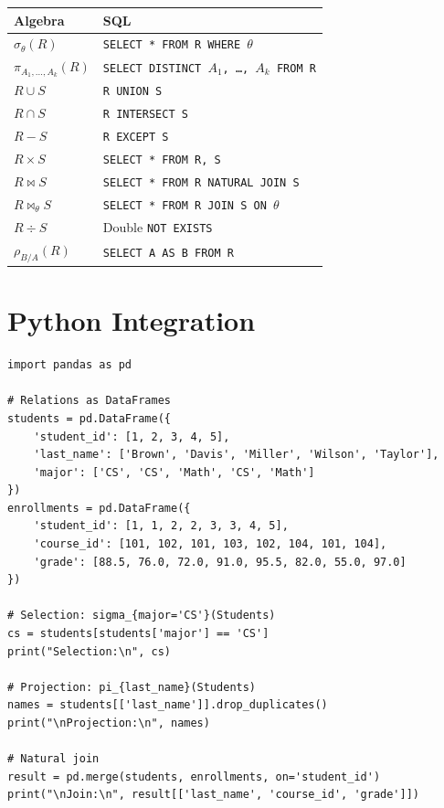 \begin{keyformulas}[title=\textbf{Relational Algebra $\leftrightarrow$ SQL Mapping}]
\begin{center}
\begin{tabular}{ll}
\toprule
\textbf{Algebra} & \textbf{SQL} \\
\midrule
$\sigma_\theta(R)$ & \texttt{SELECT * FROM R WHERE $\theta$} \\
$\pi_{A_1,\ldots,A_k}(R)$ & \texttt{SELECT DISTINCT $A_1$, \ldots, $A_k$ FROM R} \\
$R \cup S$ & \texttt{R UNION S} \\
$R \cap S$ & \texttt{R INTERSECT S} \\
$R - S$ & \texttt{R EXCEPT S} \\
$R \times S$ & \texttt{SELECT * FROM R, S} \\
$R \bowtie S$ & \texttt{SELECT * FROM R NATURAL JOIN S} \\
$R \bowtie_\theta S$ & \texttt{SELECT * FROM R JOIN S ON $\theta$} \\
$R \div S$ & Double \texttt{NOT EXISTS} \\
$\rho_{B/A}(R)$ & \texttt{SELECT A AS B FROM R} \\
\bottomrule
\end{tabular}
\end{center}
\end{keyformulas}

\section{Python Integration}

\begin{codeblock}[title=\textbf{Simulating Relational Algebra with pandas}]
\begin{verbatim}
import pandas as pd

# Relations as DataFrames
students = pd.DataFrame({
    'student_id': [1, 2, 3, 4, 5],
    'last_name': ['Brown', 'Davis', 'Miller', 'Wilson', 'Taylor'],
    'major': ['CS', 'CS', 'Math', 'CS', 'Math']
})
enrollments = pd.DataFrame({
    'student_id': [1, 1, 2, 2, 3, 3, 4, 5],
    'course_id': [101, 102, 101, 103, 102, 104, 101, 104],
    'grade': [88.5, 76.0, 72.0, 91.0, 95.5, 82.0, 55.0, 97.0]
})

# Selection: sigma_{major='CS'}(Students)
cs = students[students['major'] == 'CS']
print("Selection:\n", cs)

# Projection: pi_{last_name}(Students)
names = students[['last_name']].drop_duplicates()
print("\nProjection:\n", names)

# Natural join
result = pd.merge(students, enrollments, on='student_id')
print("\nJoin:\n", result[['last_name', 'course_id', 'grade']])
\end{verbatim}
\end{codeblock}

